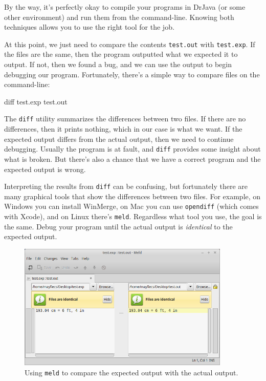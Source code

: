 \documentclass[12pt]{book}
\theoremstyle{exercise}
\begin{document}
By the way, it's perfectly okay to compile your programs in DrJava (or some other environment) and run them from the command-line.
Knowing both techniques allows you to use the right tool for the job.

At this point, we just need to compare the contents {\tt test.out} with {\tt test.exp}.
If the files are the same, then the program outputted what we expected it to output.
If not, then we found a bug, and we can use the output to begin debugging our program.
Fortunately, there's a simple way to compare files on the command-line:

\begin{stdout}
diff test.exp test.out
\end{stdout}

The {\tt diff} utility summarizes the differences between two files.
If there are no differences, then it prints nothing, which in our case is what we want.
If the expected output differs from the actual output, then we need to continue debugging.
Usually the program is at fault, and {\tt diff} provides some insight about what is broken.
But there's also a chance that we have a correct program and the expected output is wrong.

Interpreting the results from {\tt diff} can be confusing, but fortunately there are many graphical tools that show the differences between two files.
For example, on Windows you can install WinMerge, on Mac you can use {\tt opendiff} (which comes with Xcode), and on Linux there's {\tt meld}.
Regardless what tool you use, the goal is the same.
Debug your program until the actual output is {\it identical} to the expected output.

\begin{figure}[!h]
\begin{center}
\includegraphics[width=0.9\textwidth]{figs/meld.png}
\caption{Using {\tt meld} to compare the expected output with the actual output.}
\end{center}
\end{figure}
\end{document}
